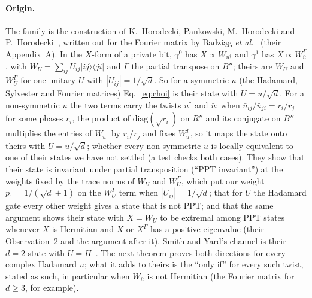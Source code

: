 \documentclass[aps,pra,twocolumn,superscriptaddress,nofootinbib,longbibliography,floatfix]{revtex4-2}
\newcommand{\ket}[1]{|#1\rangle}
\newcommand{\bra}[1]{\langle #1|}
\begin{document}
\paragraph*{Origin.} The family is the construction of K.~Horodecki, Pankowski, M.~Horodecki and P.~Horodecki~\cite{horodecki2008low}, written out for the Fourier matrix by Badzi\k{a}g \textit{et al.}~\cite{badziag2014bound} (their Appendix~A). In the $X$-form of a private bit, $\gamma^0$ has $X\propto W_{u^\dagger}$ and $\gamma^1$ has $X\propto W_{\bar u}^\varGamma$, with $W_U=\sum_{ij}U_{ij}\ket{ij}\!\bra{ji}$ and $\varGamma$ the partial transpose on $B''$; theirs are $W_U$ and $W_U^\varGamma$ for one unitary $U$ with $|U_{ij}|=1/\sqrt d$. So for a symmetric $u$ (the Hadamard, Sylvester and Fourier matrices) Eq.~\eqref{eq:choi} is their state with $U=\bar u/\sqrt d$. For a non-symmetric $u$ the two terms carry the twists $u^\dagger$ and $\bar u$; when $\bar u_{ij}/\bar u_{ji}=r_i/r_j$ for some phases $r_i$, the product of $\mathrm{diag}(\sqrt{r_i})$ on $R''$ and its conjugate on $B''$ multiplies the entries of $W_{u^\dagger}$ by $r_i/r_j$ and fixes $W_{\bar u}^\varGamma$, so it maps the state onto theirs with $U=\bar u/\sqrt d$; whether every non-symmetric $u$ is locally equivalent to one of their states we have not settled (a test checks both cases). They show that their state is invariant under partial transposition (``PPT invariant'') at the weights fixed by the trace norms of $W_U$ and $W_U^\varGamma$, which put our weight $p_1=1/(\sqrt d+1)$ on the $W_U^\varGamma$ term when $|U_{ij}|=1/\sqrt d$; that for $U$ the Hadamard gate every other weight gives a state that is not PPT; and that the same argument shows their state with $X=W_U$ to be extremal among PPT states whenever $X$ is Hermitian and $X$ or $X^\varGamma$ has a positive eigenvalue (their Observation~2 and the argument after it). Smith and Yard's channel is their $d=2$ state with $U=H$~\cite{smith2008quantum}. The next theorem proves both directions for every complex Hadamard $u$; what it adds to theirs is the ``only if'' for every such twist, stated as such, in particular when $W_{\bar u}$ is not Hermitian (the Fourier matrix for $d\ge3$, for example).
\end{document}
